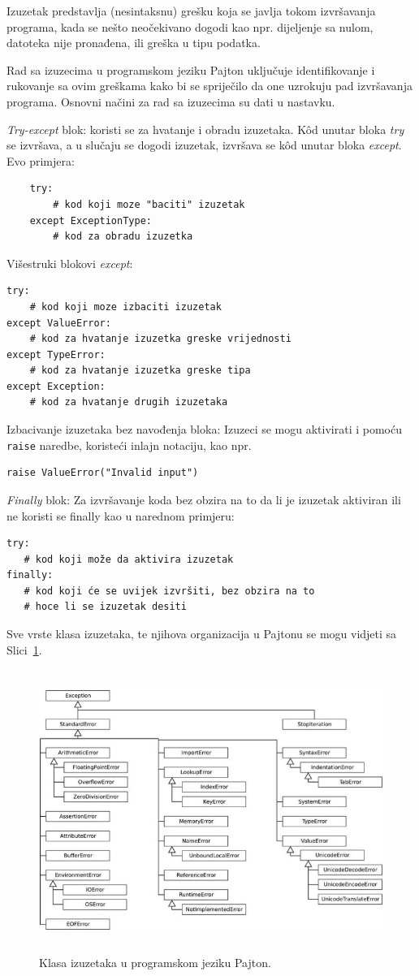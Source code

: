 Izuzetak predstavlja (nesintaksnu) grešku koja se javlja tokom izvršavanja programa, kada se nešto neočekivano dogodi kao npr. dijeljenje sa nulom, datoteka nije pronađena, ili greška u tipu podatka.

Rad sa izuzecima u programskom jeziku Pajton uključuje identifikovanje i rukovanje sa ovim greškama kako bi se spriječilo da one uzrokuju pad izvršavanja programa. Osnovni  načini za rad sa izuzecima su dati u nastavku.

\textit{Try-except }blok: koristi se za hvatanje i obradu izuzetaka. Kôd unutar bloka \textit{try} se izvršava, a u slučaju se dogodi izuzetak, izvršava se k\^od unutar bloka \textit{except}. Evo primjera:
\begin{verbatim}
	try:
	    # kod koji moze "baciti" izuzetak
	except ExceptionType:
	    # kod za obradu izuzetka
\end{verbatim}
Višestruki blokovi \textit{except}:  
\begin{verbatim}
try:
    # kod koji moze izbaciti izuzetak
except ValueError:
    # kod za hvatanje izuzetka greske vrijednosti
except TypeError:
    # kod za hvatanje izuzetka greske tipa
except Exception:
    # kod za hvatanje drugih izuzetaka
\end{verbatim}
Izbacivanje izuzetaka bez   navođenja bloka: Izuzeci se mogu aktivirati i pomoću   \texttt{raise} naredbe, koristeći inlajn notaciju, kao npr.
\begin{verbatim}
raise ValueError("Invalid input")
\end{verbatim}
\textit{Finally} blok: Za izvršavanje koda bez obzira na to da li je izuzetak aktiviran ili ne koristi se finally kao u narednom primjeru:
\begin{verbatim}
try:
   # kod koji može da aktivira izuzetak
finally:
   # kod koji će se uvijek izvršiti, bez obzira na to
   # hoce li se izuzetak desiti
\end{verbatim}

Sve vrste klasa izuzetaka, te njihova organizacija u Pajtonu se mogu vidjeti sa Slici~\ref{fig: exceptions}.  
\begin{figure}[H]
	\centering
	\includegraphics[width=400pt,height=260pt]{slike/419627_1_En_2_Fig4_HTML.jpg}
	\caption{Klasa izuzetaka u programskom jeziku Pajton.}
	\label{fig: exceptions}
\end{figure}

